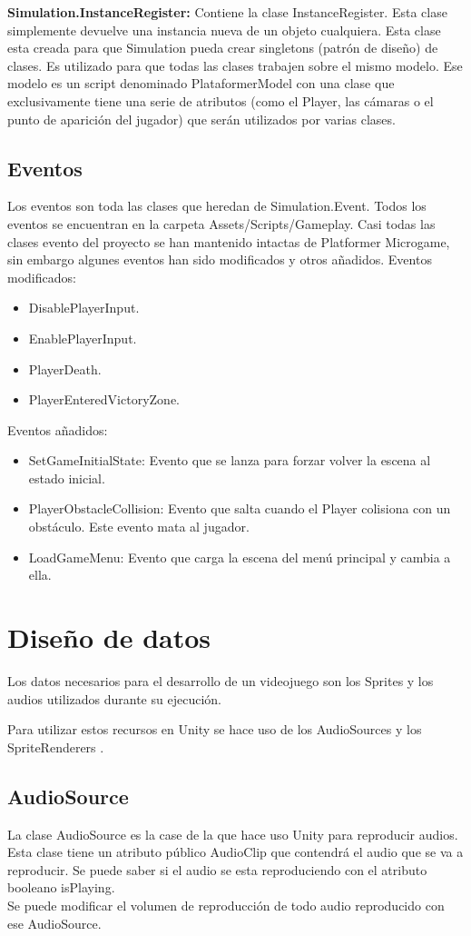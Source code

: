 \textbf{Simulation.InstanceRegister:} Contiene la clase InstanceRegister. Esta clase simplemente devuelve una instancia nueva de un objeto cualquiera. Esta clase esta creada para que Simulation pueda crear singletons (patrón de diseño) de clases. Es utilizado para que todas las clases trabajen sobre el mismo modelo. Ese modelo es un script denominado PlataformerModel con una clase que exclusivamente tiene una serie de atributos (como el Player, las cámaras o el punto de aparición del jugador) que serán utilizados por varias clases.

\subsection{Eventos}
Los eventos son toda las clases que heredan de Simulation.Event. Todos los eventos se encuentran en la carpeta Assets/Scripts/Gameplay. Casi todas las clases evento del proyecto se han mantenido intactas de Platformer Microgame, sin embargo algunes eventos han sido modificados y otros añadidos.
Eventos modificados:
\begin{itemize}
\item
DisablePlayerInput.
\item
EnablePlayerInput.
\item
PlayerDeath.
\item
PlayerEnteredVictoryZone.
\end{itemize}
Eventos añadidos:
\begin{itemize}
\item
SetGameInitialState: Evento que se lanza para forzar volver la escena al estado inicial.
\item
PlayerObstacleCollision: Evento que salta cuando el Player colisiona con un obstáculo. Este evento mata al jugador.
\item
LoadGameMenu: Evento que carga la escena del menú principal y cambia a ella.
\end{itemize}

\section{Diseño de datos}
Los datos necesarios para el desarrollo de un videojuego son los Sprites y los audios utilizados durante su ejecución.

Para utilizar estos recursos en Unity se hace uso de los AudioSources \cite{AudioSource} y los SpriteRenderers \cite{SpriteRenderer}.

\subsection{AudioSource}
La clase AudioSource es la case de la que hace uso Unity para reproducir audios. Esta clase tiene un atributo público AudioClip que contendrá el audio que se va a reproducir. Se puede saber si el audio se esta reproduciendo con el atributo booleano isPlaying.\\
Se puede modificar el volumen de reproducción de todo audio reproducido con ese AudioSource.

